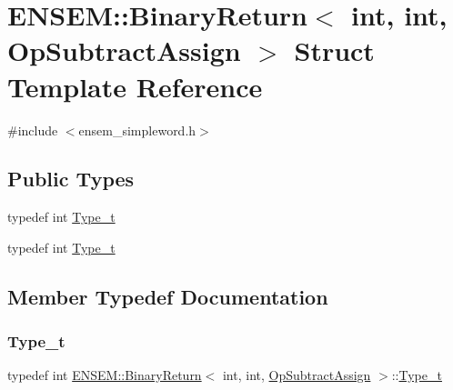 \hypertarget{structENSEM_1_1BinaryReturn_3_01int_00_01int_00_01OpSubtractAssign_01_4}{}\section{E\+N\+S\+EM\+:\+:Binary\+Return$<$ int, int, Op\+Subtract\+Assign $>$ Struct Template Reference}
\label{structENSEM_1_1BinaryReturn_3_01int_00_01int_00_01OpSubtractAssign_01_4}


{\ttfamily \#include $<$ensem\+\_\+simpleword.\+h$>$}

\subsection*{Public Types}
\begin{DoxyCompactItemize}
\item 
typedef int \mbox{\hyperlink{structENSEM_1_1BinaryReturn_3_01int_00_01int_00_01OpSubtractAssign_01_4_a5c5a1e9edfbb3a04f0197f2657b88279}{Type\+\_\+t}}
\item 
typedef int \mbox{\hyperlink{structENSEM_1_1BinaryReturn_3_01int_00_01int_00_01OpSubtractAssign_01_4_a5c5a1e9edfbb3a04f0197f2657b88279}{Type\+\_\+t}}
\end{DoxyCompactItemize}


\subsection{Member Typedef Documentation}
\mbox{\label{structENSEM_1_1BinaryReturn_3_01int_00_01int_00_01OpSubtractAssign_01_4_a5c5a1e9edfbb3a04f0197f2657b88279}} 
\subsubsection{\texorpdfstring{Type\_t}{Type\_t}\hspace{0.1cm}{\footnotesize\ttfamily [1/2]}}
{\footnotesize\ttfamily typedef int \mbox{\hyperlink{structENSEM_1_1BinaryReturn}{E\+N\+S\+E\+M\+::\+Binary\+Return}}$<$ int, int, \mbox{\hyperlink{structENSEM_1_1OpSubtractAssign}{Op\+Subtract\+Assign}} $>$\+::\mbox{\hyperlink{structENSEM_1_1BinaryReturn_3_01int_00_01int_00_01OpSubtractAssign_01_4_a5c5a1e9edfbb3a04f0197f2657b88279}{Type\+\_\+t}}}

